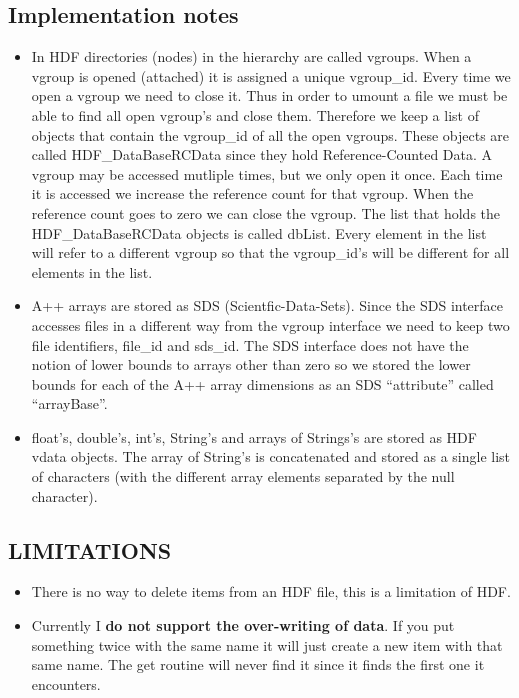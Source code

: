 \subsection{Implementation notes}

\begin{itemize}
 \item   In HDF directories (nodes) in the hierarchy are called vgroups.
  When a vgroup is opened (attached) it is assigned a unique {\ff vgroup\_id}. 
  Every time we open a vgroup we need to close it. Thus in order to {\ff umount}
  a file we must be able to find all open vgroup's and close them. 
  Therefore we keep a list of objects that contain the {\ff vgroup\_id}
  of all the open vgroups. These objects are called {\ff HDF\_DataBaseRCData}
  since they hold Reference-Counted Data.
  A vgroup may be accessed mutliple times, but we only open it once. Each time
  it is accessed we increase the reference count for that vgroup.
 When the reference
 count goes to zero we can close the vgroup. The list that holds the 
 {\ff HDF\_DataBaseRCData} objects
  is called {\ff dbList}.
 Every element in the
 list will refer to a different vgroup so that the {\ff vgroup\_id}'s will
 be different for all elements in the list.

 \item A++ arrays are stored as SDS (Scientfic-Data-Sets). Since the SDS
   interface accesses files in a different way from the vgroup interface
  we need to keep two file identifiers, {\ff file\_id} and {\ff sds\_id}.
  The SDS interface does not have the notion of lower bounds to arrays
  other than zero so we stored the lower bounds for each of the A++
  array dimensions as an SDS ``attribute'' called ``arrayBase''.

 \item {\ff float}'s, {\ff double}'s, {\ff int}'s, {\ff String}'s 
  and arrays of {\ff Strings}'s are stored as HDF vdata objects. 
  The array of {\ff String's} is concatenated and stored as a
  single list of characters (with the different array elements separated
 by the null character).
\end{itemize}


\subsection{LIMITATIONS}

\begin{itemize}
 \item There is no way to delete items from an HDF file, this is a limitation of HDF.
 \item Currently I {\bf do not support the over-writing of data}. If you put something
     twice with the same name it will just create a new item with that same name. The get
     routine will never find it since it finds the first one it encounters. 
\end{itemize}







